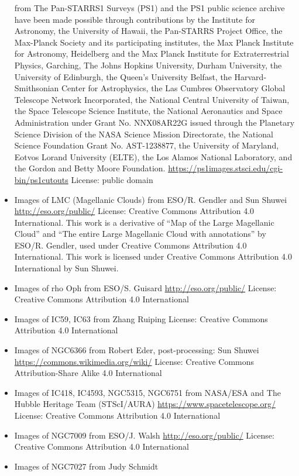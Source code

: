 \begin{itemize}
	 from The Pan-STARRS1 Surveys (PS1) and the PS1 public science archive have been made possible through contributions by the Institute for Astronomy, the University of Hawaii, the Pan-STARRS Project Office, the Max-Planck Society and its participating institutes, the Max Planck Institute for Astronomy, Heidelberg and the Max Planck Institute for Extraterrestrial Physics, Garching, The Johns Hopkins University, Durham University, the University of Edinburgh, the Queen's University Belfast, the Harvard-Smithsonian Center for Astrophysics, the Las Cumbres Observatory Global Telescope Network Incorporated, the National Central University of Taiwan, the Space Telescope Science Institute, the National Aeronautics and Space Administration under Grant No. NNX08AR22G issued through the Planetary Science Division of the NASA Science Mission Directorate, the National Science Foundation Grant No. AST-1238877, the University of Maryland, Eotvos Lorand University (ELTE), the Los Alamos National Laboratory, and the Gordon and Betty Moore Foundation.
	 \url{https://ps1images.stsci.edu/cgi-bin/ps1cutouts}
	 License: public domain
\item Images of LMC (Magellanic Clouds)
	 from ESO/R. Gendler and Sun Shuwei
	 \url{http://eso.org/public/}
	 License: Creative Commons Attribution 4.0 International. This work is a derivative of ``Map of the Large Magellanic Cloud'' and ``The entire Large Magellanic Cloud with annotations'' by ESO/R. Gendler, used under Creative Commons Attribution 4.0 International. This work is licensed under Creative Commons Attribution 4.0 International by Sun Shuwei.
\item Images of rho Oph
	 from ESO/S. Guisard
	 \url{http://eso.org/public/}
	 License: Creative Commons Attribution 4.0 International 
\item Images of IC59, IC63
	 from Zhang Ruiping
	 License: Creative Commons Attribution 4.0 International 
\item Images of NGC6366
	 from Robert Eder, post-processing: Sun Shuwei
	 \url{https://commons.wikimedia.org/wiki/}
	 License: Creative Commons Attribution-Share Alike 4.0 International
\item Images of IC418, IC4593, NGC5315, NGC6751
	 from NASA/ESA and The Hubble Heritage Team (STScI/AURA)
	 \url{https://www.spacetelescope.org/}
	 License: Creative Commons Attribution 4.0 International
\item Images of NGC7009 from ESO/J. Walsh
	 \url{http://eso.org/public/}
	 License: Creative Commons Attribution 4.0 International
\item Images of NGC7027 from Judy Schmidt

\end{itemize}
